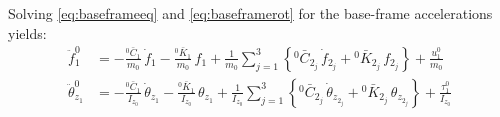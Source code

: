 Solving \eqref{eq:baseframeeq} and \eqref{eq:baseframerot} for the base-frame accelerations yields:
\begin{align}
    \ddot{f}^{0}_{1}
    &= -\frac{{}^0\bar{C}_1}{m_0}\,\dot{f}_1
       -\frac{{}^0\bar{K}_1}{m_0}\,f_1
       +\frac{1}{m_0}\sum_{j=1}^{3}\left\{
           {}^0\bar{C}_{2_j}\,\dot{f}_{2_j} + {}^0\bar{K}_{2_j}\,f_{2_j}
       \right\}
       +\frac{u^0_{1}}{m_0} \label{eq:f1ddot} \\[4pt]
    \ddot{\theta}^{0}_{z_1}
    &= -\frac{{}^0\bar{C}_1}{I_{z_0}}\,\dot{\theta}_{z_1}
       -\frac{{}^0\bar{K}_1}{I_{z_0}}\,\theta_{z_1}
       +\frac{1}{I_{z_0}}\sum_{j=1}^{3}\left\{
           {}^0\bar{C}_{2_j}\,\dot{\theta}_{z_{2_j}} + {}^0\bar{K}_{2_j}\,\theta_{z_{2_j}}
       \right\}
       +\frac{\tau^0_{1}}{I_{z_0}} \label{eq:th1ddot}
\end{align}


